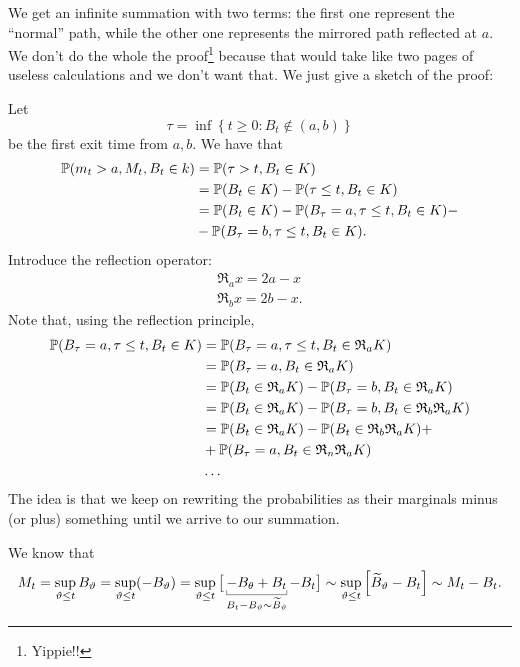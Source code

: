 \documentclass[12pt]{report}
\begin{document}
We get an infinite summation with two terms: the first one represent the ``normal'' path, while the other one represents the mirrored path reflected at $a$. We don't do the whole the proof\footnote{Yippie!!} because that would take like two pages of useless calculations and we don't want that. We just give a sketch of the proof:
\begin{fancyproof}
	Let 
	\begin{equation*}
		\tau=\inf\left\{t\geq0:B_{t}\notin(a,b)\right\}
	\end{equation*}
	be the first exit time from $a,b$. We have that 
	\begin{align*}
		\mathbb{P}(m_{t}>a,M_{t},B_{t}\in k)&=\mathbb{P}(\tau>t,B_{t}\in K)\\
		&=\mathbb{P}(B_{t}\in K)-\mathbb{P}(\tau\leq t,B_{t}\in K)\\
		&=\mathbb{P}(B_{t}\in K)-\mathbb{P}(B_{\tau}=a,\tau\leq t,B_{t}\in K)-\\
		&-\mathbb{P}(B_{\tau}=b,\tau\leq t,B_{t}\in K).
	\end{align*}
	Introduce the reflection operator:
	\begin{equation*}
		\begin{array}{c}
			\mathfrak{R}_{a}x=2a-x\\
			\mathfrak{R}_{b}x=2b-x.
		\end{array}
	\end{equation*}
	Note that, using the reflection principle,
	\begin{align*}
		\mathbb{P}(B_{\tau}=a,\tau\leq t,B_{t}\in K)&=\mathbb{P}(B_{\tau}=a,\tau\leq t,B_{t}\in\mathfrak{R}_{a}K)\\
		&=\mathbb{P}(B_{\tau}=a,B_{t}\in\mathfrak{R}_{a}K)\\
		&=\mathbb{P}(B_{t}\in\mathfrak{R}_{a}K)-\mathbb{P}(B_{\tau}=b,B_{t}\in\mathfrak{R}_{a}K)\\
		&=\mathbb{P}(B_{t}\in\mathfrak{R}_{a}K)-\mathbb{P}(B_{\tau}=b,B_{t}\in\mathfrak{R}_{b}\mathfrak{R}_{a}K)\\
		&=\mathbb{P}(B_{t}\in\mathfrak{R}_{a}K)-\mathbb{P}(B_{t}\in\mathfrak{R}_{b}\mathfrak{R}_{a}K)+\\
		&+\mathbb{P}(B_{\tau}=a,B_{t}\in\mathfrak{R}_{n}\mathfrak{R}_{a}K)\\
		&\ldots
	\end{align*}
	The idea is that we keep on rewriting the probabilities as their marginals minus (or plus) something until we arrive to our summation.
\end{fancyproof}
We know that
\begin{equation*}
	M_{t}=\sup_{\vartheta\leq t}B_{\vartheta}=\sup_{\vartheta\leq t}(-B_{\vartheta})=\sup_{\vartheta\leq t}\big[\ubracketthin{-B_{\theta}+B_{t}}_{B_{t}-B_{\vartheta}\sim\widetilde{B}_{\vartheta}}-B_{t}\big]\sim\sup_{\vartheta\leq t}\left[\widetilde{B}_{\vartheta}-B_{t}\right]\sim M_{t}-B_{t}.
\end{equation*}
\end{document}
